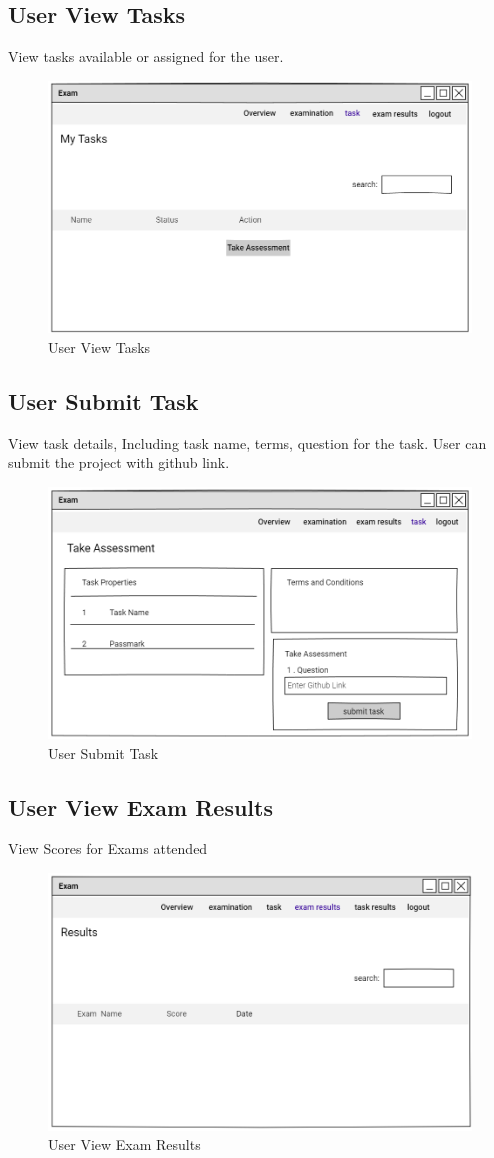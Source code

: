\documentclass[a4paper,12pt]{report}
\begin{document}
\subsection {User View Tasks}
View tasks available or assigned for the user.
\begin{figure}[bph]
	\centering
	\includegraphics[width=.6\linewidth ]{img/user/userviewtask}
\caption{User View Tasks}
\end{figure}
\subsection {User Submit Task}
View task details, Including task name, terms, question for the task. User can submit the project with github link.
\begin{figure}[bph]
	\centering
	\includegraphics[width=.6\linewidth ]{img/user/takeassessment}
	\caption{User Submit Task}
\end{figure}
\pagebreak

\subsection {User View Exam Results}
View Scores for Exams attended
\begin{figure}[bph]
	\centering
	\includegraphics[width=.6\linewidth ]{img/user/usrexmrslt}
\caption{User View Exam Results}
\end{figure}
\end{document}

